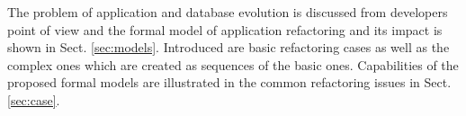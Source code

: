 \documentclass[runningheads]{comsis}
\begin{document}
The problem of application and database evolution is discussed from developers point of view and the formal model of application refactoring and its impact is shown in Sect. \ref{sec:models}. Introduced are basic refactoring cases as well as the complex ones which are created as sequences of the basic ones. Capabilities of the proposed formal models are illustrated in the common refactoring issues in Sect. \ref{sec:case}.


\end{document}
